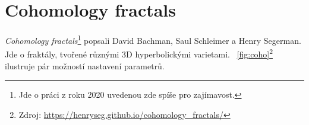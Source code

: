 \documentclass[thesis=B, czech]{FITthesis}[2019/03/06]
\begin{document}





\section{Cohomology fractals}


\textit{Cohomology fractals}\footnote{Jde o práci z roku 2020 uvedenou zde spíše pro zajímavost.} popsali David Bachman, Saul Schleimer a Henry Segerman.  Jde o fraktály, tvořené různými 3D hyperbolickými varietami. \figurename~\ref{fig:coho}\footnote{Zdroj: \url{https://henryseg.github.io/cohomology_fractals/}} ilustruje pár možností nastavení parametrů.
\end{document}
